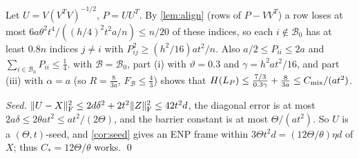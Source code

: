 Let $U=V(V^TV)^{-1/2}$, $P=UU^T$. By \cref{lem:align} (rows of $P-VV^T$) a row loses at most
$6a\theta^2t^4/((h/4)^2t^2a/n)\le n/20$ of these indices, so each $i\notin
\mathcal B_0$ has at least $0.8n$ indices $j\ne i$ with $P_{ij}^2\ge(h^2/16)at^2/n$.
Also $a/2\le P_{ii}\le2a$ and $\sum_{i\in \mathcal B_0}P_{ii}\le\frac14$.
 with $\mathcal B=\mathcal B_0$, part (i) with $\vartheta=0.3$ and
$\gamma=h^2at^2/16$, and part (iii) with $\alpha=a$ (so $R=\frac8{3a}$,
$F_{\mathcal B}\le\frac43$) shows that
$H(L_P)\le\frac{7/3}{0.3\gamma}+\frac8{3a}\le C_{\rm mix}/(at^2)$.

\emph{Seed.} $\lVert U-X\rVert_{\mathrm F}^2\le2d\delta^2+2t^2\lVert Z\rVert_{\mathrm F}^2\le42t^2d$, the diagonal error
is at most $2a\delta\le2\theta at^2\le at^2/(2\Theta)$, and the barrier constant
is at most $\Theta/(at^2)$. So $U$ is a $(\Theta,t)$-seed, and
\cref{cor:seed} gives an ENP frame within $3\Theta t^2d=(12\Theta/\theta)\eta d$
of $X$; thus $C_*=12\Theta/\theta$ works.
\qed
